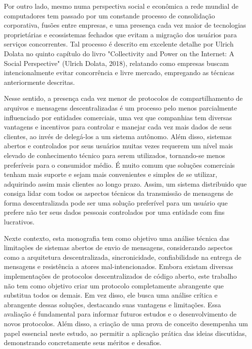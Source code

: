 Por outro lado, mesmo numa perspectiva social e econômica a rede mundial de computadores tem passado por um constande processo de consolidação corporativa, fusões entre empresas, e uma presença cada vez maior de tecnologias proprietárias e ecossistemas fechados que evitam a migração dos usuários para serviços concorrentes. Tal processo é descrito em excelente detalhe por Ulrich Dolata no quinto capítulo do livro "Collectivity and Power on the Internet: A Social Perspective" (Ulrich Dolata, 2018), relatando como empresas buscam intencionalmente evitar concorrência e livre mercado, empregando as técnicas anteriormente descritas. 

Nesse sentido, a presença cada vez menor de protocolos de compartilhamento de arquivos e mensagens descentralizadas é um processo pelo menos parcialmente influenciado por entidades comerciais, uma vez que companhias tem diversas vantagens e incentivos para controlar e manejar cada vez mais dados de seus clientes, ao invés de delegá-los a um sistema autônomo. Além disso, sistemas abertos e controlados por seus usuários muitas vezes requerem um nível mais elevado de conhecimento técnico para serem utilizados, tornando-se menos preferíveis para o consumidor médio. É muito comum que soluções comerciais tenham mais suporte e sejam mais convenientes e simples de se utilizar, adquirindo assim mais clientes ao longo prazo. Assim, um sistema distribuido que consiga lidar com todos os aspectos técnicos da transmissão de mensagens de forma descentralizada pode ser uma solução preferível para um usuário que prefere não ter seus dados pessoais controlados por uma entidade com fins lucrativos. 

Nexte contexto, esta monografia tem como objetivo uma análise técnica das limitações de sistemas abertos de envio de mensagens, considerando aspectos como a arquitetura descentralizada, sincronicidade, confiabilidade na entrega de mensagens e resistência a atores mal-intencionados. Embora existam diversas implementações de protocolos descentralizados de código aberto, este trabalho não tem como objetivo criar um protocolo completamente abrangente que substitua todos os demais. Em vez disso, ele busca uma análise crítica e abrangente dessas soluções, destacando suas vantagens e limitações. Essa avaliação é fundamental para informar futuros estudos e o desenvolvimento de novos protocolos. Além disso, a criação de uma prova de conceito desempenha um papel essencial neste estudo, ao permitir a aplicação prática das ideias discutidas, demonstrando concretamente seus méritos e desafios.
